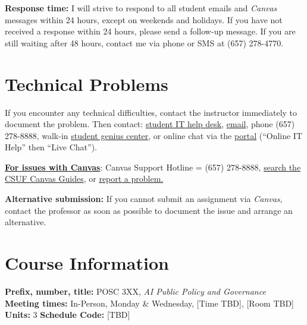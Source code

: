 \documentclass[12pt]{article}
\begin{document}
\vspace{0.5em}
\noindent \textbf{Response time:} I will strive to respond to all student emails and \emph{Canvas} messages within 24 hours, except on weekends and holidays. If you have not received a response within 24 hours, please send a follow-up message. If you are still waiting after 48 hours, contact me via phone or SMS at (657) 278-4770.

\section*{Technical Problems}

If you encounter any technical difficulties, contact the instructor immediately to document the problem. Then contact: \href{http://www.fullerton.edu/it/students/helpdesk/index.php}{student IT help desk}, \href{mailto:StudentITHelpDesk@fullerton.edu}{email}, phone (657) 278-8888, walk-in \href{http://www.fullerton.edu/it/students/sgc/index.php}{student genius center}, or online chat via the \href{http://my.fullerton.edu}{portal} (``Online IT Help'' then ``Live Chat'').

\vspace{0.5em}
\noindent \textbf{\underline{For issues with Canvas}}: Canvas Support Hotline = (657) 278-8888, \href{https://canvashelp.fullerton.edu/}{search the CSUF Canvas Guides}, or \href{https://titans.service-now.com/sp?id=sc_cat_item&sys_id=f88efe80ebea6a10fb7cfcffcad0cdc6&subject=Canvas}{report a problem.}

\vspace{0.5em}
\noindent \textbf{Alternative submission:} If you cannot submit an assignment via \emph{Canvas}, contact the professor as soon as possible to document the issue and arrange an alternative.

\section*{Course Information}
\noindent \textbf{Prefix, number, title:} POSC 3XX, \textit{AI Public Policy and Governance} \\
\noindent \textbf{Meeting times:} In-Person, Monday \& Wednesday, [Time TBD], [Room TBD] \\
\noindent \textbf{Units:} 3 \quad \textbf{Schedule Code:} [TBD]
\end{document}
